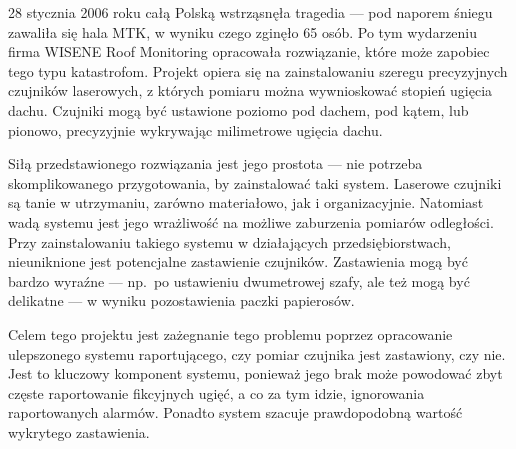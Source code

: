 28 stycznia 2006 roku całą Polską wstrząsnęła tragedia — pod naporem śniegu zawaliła się hala MTK, w wyniku czego
zginęło 65 osób.
Po tym wydarzeniu firma WISENE Roof Monitoring opracowała rozwiązanie, które może zapobiec tego
typu katastrofom.
Projekt opiera się na zainstalowaniu szeregu precyzyjnych czujników laserowych, z których pomiaru można wywnioskować stopień ugięcia dachu.
Czujniki mogą być ustawione poziomo pod dachem, pod kątem, lub pionowo, precyzyjnie wykrywając milimetrowe ugięcia dachu.

Siłą przedstawionego rozwiązania jest jego prostota — nie potrzeba skomplikowanego przygotowania, by zainstalować taki system.
Laserowe czujniki są tanie w utrzymaniu, zarówno materiałowo, jak i organizacyjnie.
Natomiast wadą systemu jest jego wrażliwość na możliwe zaburzenia pomiarów odległości.
Przy zainstalowaniu takiego systemu w działających przedsiębiorstwach, nieuniknione jest potencjalne zastawienie czujników.
Zastawienia mogą być bardzo wyraźne — np.\ po ustawieniu dwumetrowej szafy, ale też mogą być delikatne — w wyniku pozostawienia paczki papierosów.

Celem tego projektu jest zażegnanie tego problemu poprzez opracowanie ulepszonego systemu raportującego, czy pomiar czujnika jest zastawiony, czy nie.
Jest to kluczowy komponent systemu, ponieważ jego brak może powodować zbyt częste raportowanie fikcyjnych ugięć, a co za tym idzie, ignorowania raportowanych alarmów.
Ponadto system szacuje prawdopodobną wartość wykrytego zastawienia.